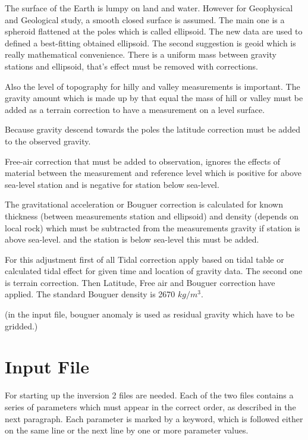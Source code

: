 The surface of the Earth is lumpy on land and water. However for Geophysical and Geological study, a smooth closed surface is assumed. The main one is a spheroid flattened at the poles which is called ellipsoid. The new data are used to defined a best-fitting obtained ellipsoid. The second suggestion is geoid which is really mathematical convenience. There is a uniform mass between gravity stations and ellipsoid, that's effect must be removed with corrections.

Also the level of topography for hilly and valley measurements is important. The gravity amount which is made up by that equal the mass of hill or valley must be added as a terrain correction to have a measurement on a level surface.

Because gravity descend towards the poles the latitude correction must be added to the observed gravity.

Free-air correction that must be added to observation, ignores the effects of material between the measurement and reference level which is positive for above sea-level station and is negative for station below sea-level.

The gravitational acceleration or Bouguer correction is calculated for known thickness (between measurements station and ellipsoid) and density (depends on local rock) which must be subtracted from the measurements gravity if station is above sea-level. and the station is below sea-level this must be added.

For this adjustment first of all Tidal correction apply based on tidal table or calculated tidal effect for given time and location of gravity data. The second one is terrain correction. Then Latitude, Free air and Bouguer correction have applied. The standard Bouguer density is 2670 $kg/m^3$.

(in the input file, bouguer anomaly is used as residual gravity  which have to be gridded.)



\section{Input File} 

For starting up the inversion 2 files are needed. Each of the two files contains a series of parameters which must appear in the correct order, as described in the next paragraph. Each parameter is marked by a keyword, which is followed either on the same line or the next line by one or more parameter values. 

